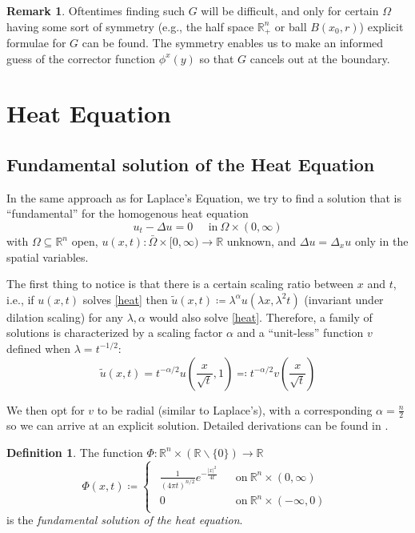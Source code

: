 \documentclass[openany, amssymb, psamsfonts]{amsart}
\theoremstyle{definition}
\newtheorem{defn}{Definition}[section]
\newtheorem{rem}{Remark}[section]
\numberwithin{equation}{section}
\newcommand{\bbr}{\mathbb{R}}
\begin{document}
\begin{rem}
Oftentimes finding such $G$ will be difficult, and only for certain $\Omega$ having some sort of symmetry (e.g., the half space $\bbr^n_+$ or ball $B(x_0, r)$) explicit formulae for $G$ can be found. The symmetry enables us to make an informed guess of the corrector function $\phi^x(y)$ so that $G$ cancels out at the boundary.
\end{rem}

\section{Heat Equation}
\subsection{Fundamental solution of the Heat Equation}
In the same approach as for Laplace's Equation, we try to find a solution that is ``fundamental'' for the homogenous heat equation
\begin{equation} \label{heat}
    u_t - \Delta u = 0 \;\;\;\;\; \text{in}\: \Omega \times (0, \infty)
\end{equation}
with $\Omega \subseteq \bbr^n$ open, $u(x, t): \bar{\Omega} \times [0, \infty) \to \bbr$ unknown, and $\Delta u = \Delta_x u$ only in the spatial variables.

The first thing to notice is that there is a certain scaling ratio between $x$ and $t$, i.e., if $u(x, t)$ solves \eqref{heat} then $\tilde{u}(x, t) \coloneqq \lambda^\alpha u(\lambda x, \lambda^2 t)$ (invariant under dilation scaling) for any $\lambda, \alpha$ would also solve \eqref{heat}. Therefore, a family of solutions is characterized by a scaling factor $\alpha$ and a ``unit-less'' function $v$ defined when $\lambda = t^{-1/2}$:
\begin{equation}
    \tilde{u}(x, t) = t^{-\alpha/2}u\left(\frac{x}{\sqrt{t}}, 1\right) \eqqcolon t^{-\alpha/2} v\left(\frac{x}{\sqrt{t}}\right)
\end{equation}

We then opt for $v$ to be radial (similar to Laplace's), with a corresponding $\alpha = \frac{n}{2}$ so we can arrive at an explicit solution. Detailed derivations can be found in \cite{Evans}.
\begin{defn} The function $\Phi: \bbr^n \times (\bbr \backslash \{0\}) \to \bbr$ \begin{equation} \label{heat_fund}
    \Phi(x, t) \coloneqq \begin{cases}
        \begin{aligned}
            \frac{1}{(4\pi t)^{n/2}}e ^{-\frac{|x|^2}{4t}} &&\text{on} \: \bbr^n \times (0, \infty) \\
            0  &&\text{on} \: \bbr^n \times (-\infty, 0)
        \end{aligned}
    \end{cases}
\end{equation}
is the \textit{fundamental solution of the heat equation}.
\end{defn}
\end{document}

